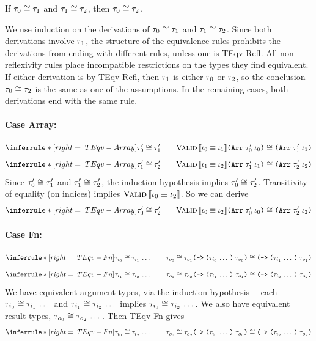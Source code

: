 \begin{lemma}
  \label{TransTEqv}
  If $\mathit{\tau}_0 \cong \mathit{\tau}_1$ and $\mathit{\tau}_1 \cong \mathit{\tau}_2$,
  then $\mathit{\tau}_0 \cong \mathit{\tau}_2$.
\end{lemma}
\begin{sproof}
  We use induction on the derivations of $\mathit{\tau}_0 \cong \mathit{\tau}_1$ and $\mathit{\tau}_1 \cong \mathit{\tau}_2$.
  Since both derivations involve $\mathit{\tau}_1$,
  the structure of the equivalence rules prohibits the derivations from ending with different rules,
  unless one is {\sc TEqv-Refl}.
  All non-reflexivity rules place incompatible restrictions on the types they find equivalent.
  If either derivation is by {\sc TEqv-Refl},
  then $\mathit{\tau}_1$ is either $\mathit{\tau}_0$ or $\mathit{\tau}_2$,
  so the conclusion $\mathit{\tau}_0 \cong \mathit{\tau}_2$ is the same as one of the assumptions.
  In the remaining cases, both derivations end with the same rule.
  \paragraph{Case {\sc Array}:}
  \[
  \infr[TEqv-Array]
  {\teqv{\type_0'}{\type_1'} \qquad {\ieqv{\idx_0}{\idx_1}}}
  {\teqv{\typearray{\type_0'}{\idx_0}}{\typearray{\type_1'}{\idx_1}}}\]
  \ctrand
  \[\infr[TEqv-Array]
  {\teqv{\type_1'}{\type_2'} \qquad {\ieqv{\idx_1}{\idx_2}}}
  {\teqv{\typearray{\type_1'}{\idx_1}}{\typearray{\type_2'}{\idx_2}}}
  \]
  Since $\mathit{\tau}_0' \cong \mathit{\tau}_1'$ and $\mathit{\tau}_1' \cong \mathit{\tau}_2'$,
  the induction hypothesis implies $\mathit{\tau}_0' \cong \mathit{\tau}_2'$.
  Transitivity of equality (on indices) implies $\text{\sc Valid} \left\llbracket \mathit{\iota}_0 \equiv \mathit{\iota}_2 \right\rrbracket$.
  So we can derive
  \[\infr[TEqv-Array]
  {\teqv{\type_0'}{\type_2'} \qquad {\ieqv{\idx_0}{\idx_2}}}
  {\teqv{\typearray{\type_0'}{\idx_0}}{\typearray{\type_2'}{\idx_2}}}\]
  \paragraph{Case {\sc Fn}:}
  \[\infr[TEqv-Fn]
  {\sequence{\teqv{\type_{i_0}}{\type_{i_1}}}
    \qquad {\teqv{\type_{o_0}}{\type_{o_1}}}}
  {\teqv
    {\typefun{\sequence{\type_{i_0}}}{\type_{o_0}}}
    {\typefun{\sequence{\type_{i_1}}}{\type_{o_1}}}}\]
  \ctrand
  \[\infr[TEqv-Fn]
  {\sequence{\teqv{\type_{i_1}}{\type_{i_2}}}
    \qquad {\teqv{\type_{o_1}}{\type_{o_2}}}}
  {\teqv
    {\typefun{\sequence{\type_{i_1}}}{\type_{o_1}}}
    {\typefun{\sequence{\type_{i_2}}}{\type_{o_2}}}}\]
  We have equivalent argument types, via the induction hypothesis---%
  each $\mathit{\tau}_{i_0} \cong \mathit{\tau}_{i_1} \, \ldots \,$ and $\mathit{\tau}_{i_1} \cong \mathit{\tau}_{i_2} \, \ldots \,$
  implies $\mathit{\tau}_{i_0} \cong \mathit{\tau}_{i_2} \, \ldots \,$.
  We also have equivalent result types, $\mathit{\tau}_{o_0} \cong \mathit{\tau}_{o_2} \, \ldots \,$.
  Then {\sc TEqv-Fn} gives
  \[\infr[TEqv-Fn]
  {\sequence{\teqv{\type_{i_0}}{\type_{i_2}}} \qquad {\teqv{\type_{o_0}}{\type_{o_2}}}}
  {\teqv{\typefun{\sequence{\type_{i_0}}}{\type_{o_0}}}{\typefun{\sequence{\type_{i_2}}}{\type_{o_2}}}}\]

\end{sproof}
